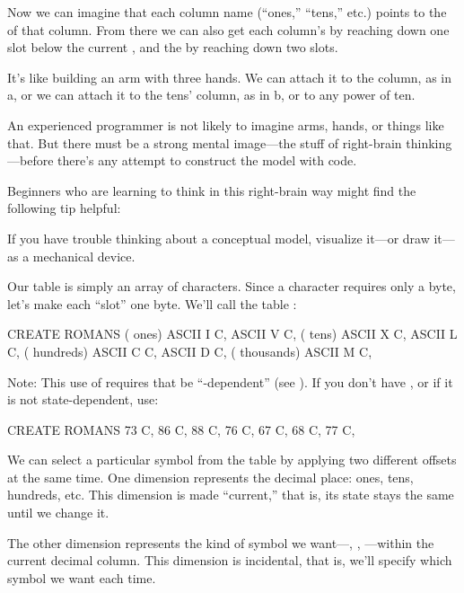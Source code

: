 \noindent Now we can imagine that each column name (``ones,''
``tens,'' etc.) points to the  of that column. From there we can
also get each column's  by reaching down one slot below the
current , and the  by reaching down two slots.

It's like building an arm with three hands. We can attach it to the
 column, as in a, or we can attach it to the tens' column,
as in b, or to any power of ten.



An experienced \Forth{} programmer is not likely to imagine arms,
hands, or things like that. But there must be a strong mental image---the
stuff of right-brain thinking---before there's any attempt to construct the
model with code.

Beginners who are learning to think in this right-brain way might
find the following tip helpful:

\begin{tip}
If you have trouble thinking about a conceptual model,
visualize it---or draw it---as a mechanical device.
\end{tip}
Our table is simply an array of characters. Since a character requires only
a byte, let's make each ``slot'' one byte. We'll call the table :

\begin{Code}
CREATE ROMANS    ( ones)  ASCII I  C,   ASCII V  C,
                 ( tens)  ASCII X  C,   ASCII L  C,
             ( hundreds)  ASCII C  C,   ASCII D  C,
            ( thousands)  ASCII M  C,
\end{Code}
Note: This use of  requires that  be
``-dependent'' (see ). If you don't have ,
or if it is not state-dependent, use:

\begin{Code}
CREATE ROMANS  73 C,  86 C,  88 C,  76 C,
   67 C,  68 C,  77 C,
\end{Code}
We can select a particular symbol from the table by applying two
different offsets at the same time. One dimension represents the decimal
place: ones, tens, hundreds, etc. This dimension is made ``current,'' that
is, its state stays the same until we change it.

The other dimension represents the kind of symbol we want---,
, ---within the current decimal column. This
dimension is incidental, that is, we'll specify which symbol we want each
time.

